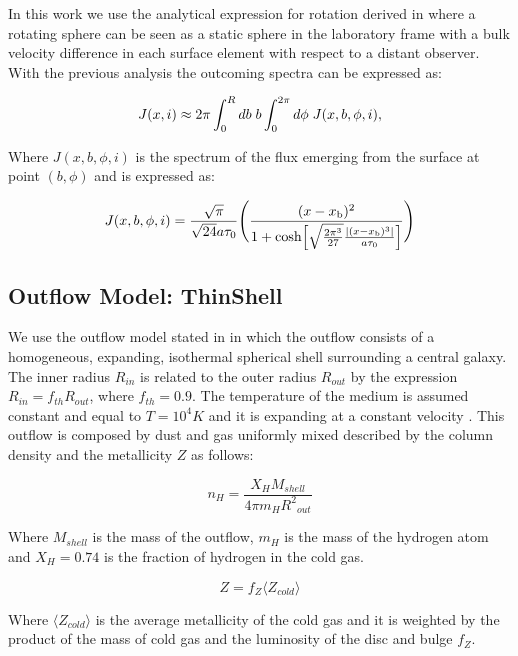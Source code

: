 \documentclass{latex/emulateapj}
\begin{document}
In this work we use the analytical expression for rotation derived in \citep{Garavito14} where a rotating sphere can be seen as a static sphere in the laboratory frame with a bulk velocity difference in each surface element with respect
to a distant observer. With the previous analysis the outcoming spectra can be expressed as:

\begin{equation}
J(x,i) \approx 2\pi \int_0^Rdb \hs b
\int_0^{2\pi}d\phi \hs J(x,b,\phi,i),
\end{equation}

Where $J(x, b, \phi, i)$ is the spectrum of the flux emerging from the surface at point $(b, \phi)$ and is expressed as:

\begin{equation}
J(x,b,\phi,i)=\frac{\sqrt{\pi}}{\sqrt{24}a\tau_0}\Bigg{(}\frac{(x-x_{\rm b})^2}{1+{\rm cosh}\Big{[}\sqrt{\frac{2\pi^3}{27}}\frac{|(x-x_{\rm b})^3|}{a\tau_0}\Big{]}}\Bigg{)}
\end{equation}


\subsection{Outflow Model: ThinShell}

We use the outflow model stated in \citep{Orsi12} in which the outflow consists of a homogeneous, expanding, isothermal spherical shell surrounding a central galaxy. The inner radius $R_{in}$ is related to the outer radius $R_{out}$ by the expression $R_{in} = f_{th}R_{out}$, where $f_{th}=0.9$. The temperature of the medium is assumed constant and equal to $T=10^4 K$ and it is expanding at a constant velocity \vel. This outflow is composed by dust and gas uniformly mixed described by the column density \nh and the metallicity $Z$ as follows:

\begin{equation}
\label{eq:nh}
n_H = \frac{X_H M_{shell}}{4\pi m_H {R^2}_{out}}
\end{equation}

Where $M_{shell}$ is the mass of the outflow, $m_H$ is the mass of the hydrogen atom and $X_H=0.74$ is the fraction of hydrogen in the cold gas.

\begin{equation}
\label{eq:z}
Z = f_Z \langle Z_{cold} \rangle
\end{equation}

Where $\langle Z_{cold} \rangle$ is the average metallicity of the cold gas and it is weighted by the product of the mass of cold gas and the \lya luminosity of the disc and bulge $f_Z$. \\
\end{document}
